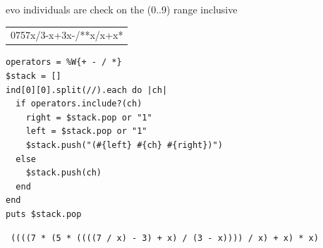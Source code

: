\documentclass[11pt]{article}
\begin{document}
evo individuals are check on the (0..9) range inclusive


\begin{center}
\begin{tabular}{l}
 0757x/3-x+3x-/**x/x+x*  \\
\end{tabular}
\end{center}



\lstset{language=Ruby}
\begin{lstlisting}
operators = %W{+ - / *}
$stack = []
ind[0][0].split(//).each do |ch|
  if operators.include?(ch)
    right = $stack.pop or "1"
    left = $stack.pop or "1"
    $stack.push("(#{left} #{ch} #{right})")
  else
    $stack.push(ch)
  end
end
puts $stack.pop
\end{lstlisting}

\begin{verbatim}
 ((((7 * (5 * ((((7 / x) - 3) + x) / (3 - x)))) / x) + x) * x)
\end{verbatim}
\end{document}
